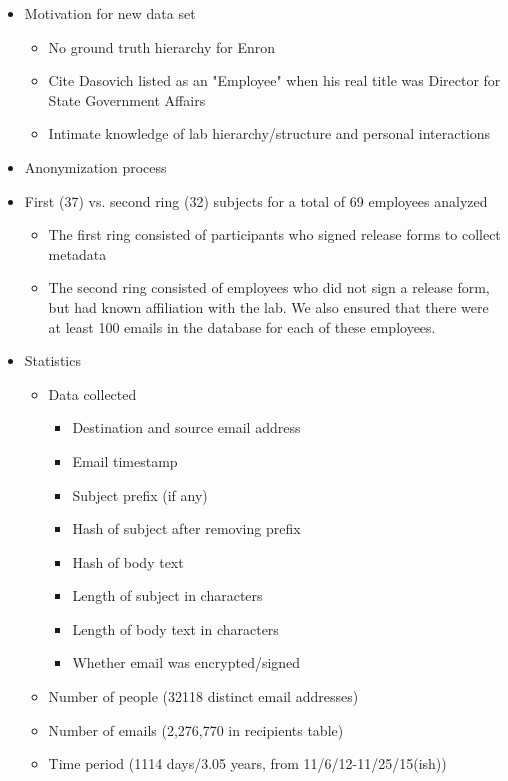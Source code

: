 \documentclass{article}
\begin{document}
\begin{itemize}
\item Motivation for new data set
    \begin{itemize}
    \item No ground truth hierarchy for Enron
    \item Cite Dasovich listed as an "Employee" when his real title was  Director for State Government Affairs
    \item Intimate knowledge of lab hierarchy/structure and personal interactions
    \end{itemize}
\item Anonymization process
\item First (37) vs. second ring (32) subjects for a total of 69 employees analyzed
    \begin{itemize}
    \item The first ring consisted of participants who signed release forms to collect metadata
    \item The second ring consisted of employees who did not sign a release form, but had known affiliation with the lab.  We also ensured that there were at least 100 emails in the database for each of these employees.
    \end{itemize}
\item Statistics
    \begin{itemize}
    \item Data collected
        \begin{itemize}
        \item Destination and source email address
        \item Email timestamp
        \item Subject prefix (if any)
        \item Hash of subject after removing prefix
        \item Hash of body text
        \item Length of subject in characters
        \item Length of body text in characters
        \item Whether email was encrypted/signed
        \end{itemize}
    \item Number of people (32118 distinct email addresses)
    \item Number of emails (2,276,770 in recipients table)
    \item Time period (1114 days/3.05 years, from 11/6/12-11/25/15(ish))
    \end{itemize}
\end{itemize}
\end{document}
